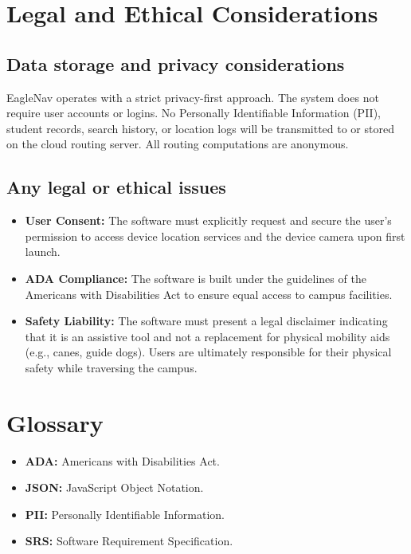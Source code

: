 \documentclass[12pt]{article}
\begin{document}
\section{Legal and Ethical Considerations}

\subsection{Data storage and privacy considerations}
EagleNav operates with a strict privacy-first approach. The system does not require user accounts or logins. No Personally Identifiable Information (PII), student records, search history, or location logs will be transmitted to or stored on the cloud routing server. All routing computations are anonymous. 

\subsection{Any legal or ethical issues}
\begin{itemize}[noitemsep]
    \item \textbf{User Consent:} The software must explicitly request and secure the user's permission to access device location services and the device camera upon first launch.
    \item \textbf{ADA Compliance:} The software is built under the guidelines of the Americans with Disabilities Act to ensure equal access to campus facilities.
    \item \textbf{Safety Liability:} The software must present a legal disclaimer indicating that it is an assistive tool and not a replacement for physical mobility aids (e.g., canes, guide dogs). Users are ultimately responsible for their physical safety while traversing the campus.
\end{itemize}

\section{Glossary}
\begin{itemize}[noitemsep]
    \item \textbf{ADA:} Americans with Disabilities Act.
    \item \textbf{JSON:} JavaScript Object Notation.
    \item \textbf{PII:} Personally Identifiable Information.
    \item \textbf{SRS:} Software Requirement Specification.
\end{itemize}
\end{document}
